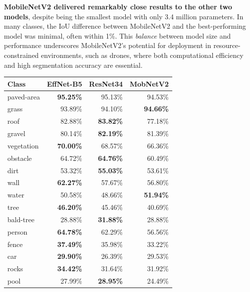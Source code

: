\documentclass[a4paper]{article}
\begin{document}
\textbf{MobileNetV2 delivered remarkably close results to the other two models}, despite being the smallest model with only 3.4 million parameters. In many classes, the IoU difference between MobileNetV2 and the best-performing model was minimal, often within 1\%. This \textit{balance} between model size and performance underscores MobileNetV2’s potential for deployment in resource-constrained environments, such as drones, where both computational efficiency and high segmentation accuracy are essential.

\begin{table}[htbp]
    \centering
    \small
    \setlength{\tabcolsep}{5pt} %
    \begin{tabular}{|l|r|r|r|}
    \hline
    \textbf{Class} & \textbf{EffNet-B5} & \textbf{ResNet34} & \textbf{MobNetV2} \\ \hline
    paved-area     & \textbf{95.25\%} & 95.13\% & 94.53\% \\ \hline
    grass          & 93.89\% & 94.10\% & \textbf{94.66\%} \\ \hline
    roof           & 82.88\% & \textbf{83.82\%} & 77.18\% \\ \hline
    gravel         & 80.14\% & \textbf{82.19\%} & 81.39\% \\ \hline
    vegetation     & \textbf{70.00\%} & 68.57\% & 66.36\% \\ \hline
    obstacle       & 64.72\% & \textbf{64.76\%} & 60.49\% \\ \hline
    dirt           & 53.32\% & \textbf{55.03\%} & 53.61\% \\ \hline
    wall           & \textbf{62.27\%} & 57.67\% & 56.80\% \\ \hline
    water          & 50.58\% & 48.66\% & \textbf{51.94\%} \\ \hline
    tree           & \textbf{46.20\%} & 45.46\% & 40.69\% \\ \hline
    bald-tree      & 28.88\% & \textbf{31.88\%} & 28.88\% \\ \hline
    person         & \textbf{64.78\%} & 62.29\% & 56.56\% \\ \hline
    fence          & \textbf{37.49\%} & 35.98\% & 33.22\% \\ \hline
    car            & \textbf{29.90\%} & 26.39\% & 29.53\% \\ \hline
    rocks          & \textbf{34.42\%} & 31.64\% & 31.92\% \\ \hline
    pool           & 27.99\% & \textbf{28.95\%} & 24.49\% \\ \hline

\end{tabular}
\end{table}
\end{document}
